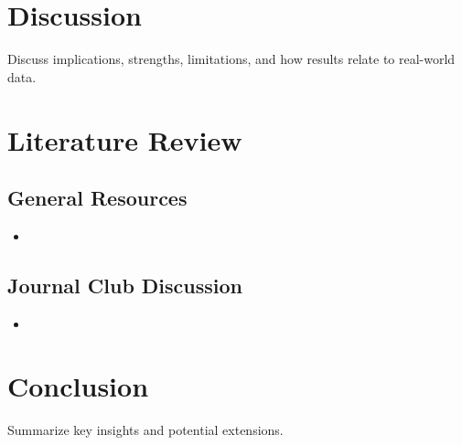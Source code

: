 \documentclass{article}
\begin{document}
\section{Discussion}
Discuss implications, strengths, limitations, and how results relate to real-world data.

\section{Literature Review}
\subsection{General Resources}
\begin{itemize}
    \item \textcite{example_reference1}
\end{itemize}

\subsection{Journal Club Discussion}
\begin{itemize}
    \item \textcite{example_reference2}
\end{itemize}

\section{Conclusion}
Summarize key insights and potential extensions.

\printbibliography
\end{document}
